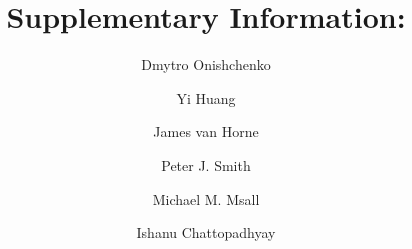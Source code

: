 \documentclass[3p,super,numbers,sort&compress,preprint,10pt]{elsarticle}
\begin{document}
\begin{frontmatter}
\title{{\Large\bf Supplementary Information:}\\\TITLE} 
\author[ad1]{Dmytro Onishchenko}
\author[ad1]{Yi Huang}
\author[ad1]{James van Horne}
\author[ad4,ad7]{Peter J. Smith}
\author[ad5,ad6]{Michael M. Msall}
\author[ad1,ad2,ad3]{Ishanu Chattopadhyay}

\address[ad1]{Department of Medicine, University of Chicago, Chicago, IL, USA}
\address[ad2]{Committee on Genetics, Genomics \& Systems Biology, University of Chicago, Chicago, IL, USA}
\address[ad3]{Committee on Quantitative Methods in Social, Behavioral, and Health Sciences, University of Chicago, Chicago, IL, USA}
\address[ad4]{Department of Pediatrics, Section of Developmental and Behavioral Pediatrics, University of Chicago, Chicago, IL, USA}
\address[ad5]{Department of Pediatrics, Section Chief of Developmental and Behavioral Pediatrics, University of Chicago, Chicago, IL, USA}
\address[ad6]{Joseph  P. Kennedy Research Center on Intellectual and Neurodevelopmental Disabilities, University of Chicago, Chicago, IL, USA}
\address[ad7]{Executive Committee Chair, American Academy of Pediatrics’ Section on Developmental and Behavioral Pediatrics}

\end{frontmatter}

\tableofcontents

\listoffigures

\listoftables


\end{document}
